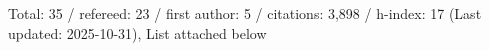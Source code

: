 Total: 35 / refereed: 23 / first author: 5 / citations: 3,898 / h-index: 17 (Last updated: 2025-10-31), List attached below